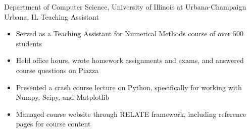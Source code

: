
        {Department of Computer Science, University of Illinois at Urbana-Champaign}
        {Urbana, IL}
        {Teaching Assistant}
        {}{
    \begin{itemize}
        \item Served as a Teaching Assistant for Numerical Methods course of over 500 students
        \item Held office hours, wrote homework assignments and exams, and answered course questions on Piazza
        \item Presented a crash course lecture on Python, specifically for working with Numpy, Scipy, and Matplotlib
        \item Managed course website through RELATE framework, including reference pages for course content
    \end{itemize}
}
